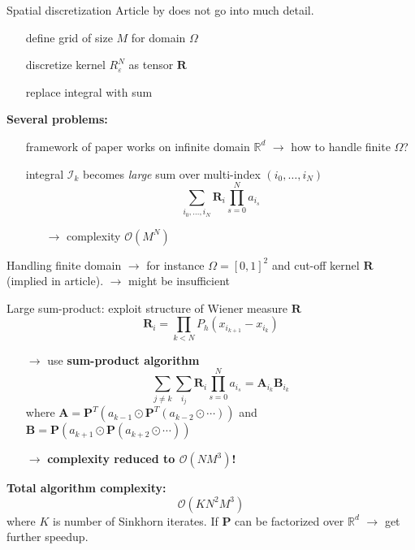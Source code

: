 \documentclass[xcolor={dvipsnames}]{beamer}
\newcommand{\RR}{\mathbb{R}}
\newcommand{\bfR}{\mathbf{R}}
\newcommand{\bfP}{\mathbf{P}}
\newcommand{\calI}{\mathcal{I}}
\newcommand{\calO}{\mathcal{O}}
\renewcommand{\epsilon}{\varepsilon}
\newcommand{\redfont}{\color{darkred}}
\newcommand{\greenfont}{\color{Green!90!black}}
\begin{document}
\begin{frame}{Spatial discretization}
	Article by \textcite{benamou2018entropy} does not go into much detail.
	\begin{itemize}
		\item[\textbullet] define grid of size $M$ for domain $\Omega$
		\item[\textbullet] discretize kernel $R^N_\epsilon$ as tensor $\bfR$
		\item[\textbullet] replace integral with sum
	\end{itemize}
	
	\pause\textbf{\redfont Several problems:}
	\begin{itemize}
		\item[\textbullet] framework of paper works on infinite domain $\RR^d$ $\rightarrow$ how to handle finite $\Omega$?
		\item[\textbullet] integral $\calI_k$ becomes \textit{large} sum over multi-index $(i_0,\ldots,i_N)$
		\[
			\sum_{i_0,\ldots,i_N} \bfR_i \prod_{s=0}^N a_{i_s}
		\]
		\begin{itemize}
			\item[$\rightarrow$] \redfont complexity $\calO(M^N)$
		\end{itemize}
	\end{itemize}
	
\end{frame}

\begin{frame}
	Handling finite domain $\rightarrow$ for instance $\Omega = [0,1]^2$ and cut-off kernel $\bfR$ (implied in article).
	{\redfont $\rightarrow$ might be insufficient}
	
	Large sum-product: exploit structure of Wiener measure $\bfR$
	\[
		\bfR_i = \prod_{k<N} P_h(x_{i_{k+1}} - x_{i_k})
	\]\pause
	\begin{itemize}
		\item[$\rightarrow$] use \textbf{sum-product algorithm}
		\[
		\sum_{j\neq k}\sum_{i_j} \bfR_i \prod_{s=0}^N a_{i_s} =
		\mathbf{A}_{i_k} \mathbf{B}_{i_k}
		\]
		where $\mathbf{A} = \bfP^T(a_{k-1} \odot \bfP^T(a_{k-2}\odot\cdots))$ and $\mathbf{B} = \bfP(a_{k+1} \odot \bfP (a_{k+2}\odot\cdots))$
		\item[$\rightarrow$] {\boldmath\bfseries\greenfont complexity reduced to $\calO(NM^3)$!}
	\end{itemize}
\end{frame}

\begin{frame}
	\textbf{Total algorithm complexity:} 
	\[
		\calO(K N^2 M^3)
	\]
	where $K$ is number of Sinkhorn iterates. If $\bfP$ can be factorized over $\RR^d$ $\rightarrow$ get further speedup.
	
\end{frame}
\end{document}
